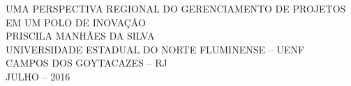 \begin{titlepage}
 \begin{center}
   {\large UMA PERSPECTIVA REGIONAL DO GERENCIAMENTO DE PROJETOS EM UM POLO DE INOVAÇÃO} \\ [7cm]
   {\large PRISCILA MANHÃES DA SILVA} \\ [4cm]
   \vfill
   {\large UNIVERSIDADE ESTADUAL DO NORTE FLUMINENSE – UENF} \\ [1cm]
   {\large CAMPOS DOS GOYTACAZES – RJ} \\
   {\large JULHO – 2016}
 \end{center}
\end{titlepage}
